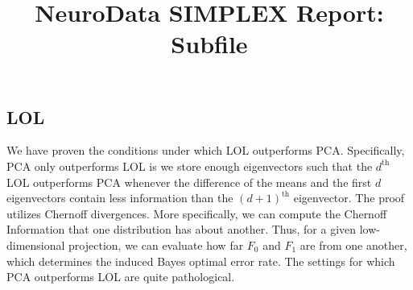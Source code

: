 \documentclass[simplex.tex]{subfiles}
\title{NeuroData SIMPLEX Report: Subfile}
\begin{document}

\subsection{LOL}

We have proven the conditions under which LOL outperforms PCA.
Specifically, PCA only outperforms LOL is we store enough eigenvectors
such that the $d^\text{th}$ LOL outperforms PCA whenever the difference of the means
and the first $d$ eigenvectors contain less information than the $(d + 1)^{\text{th}}$
eigenvector.  The proof utilizes Chernoff divergences. More
specifically, we can compute the Chernoff Information that one
distribution has about another.  Thus, for a given low-dimensional
projection, we can evaluate how far  $F_0$ and  $F_1$ are from one another, which
determines the induced Bayes optimal error rate. The settings for which
PCA outperforms LOL are quite pathological.
\end{document}

